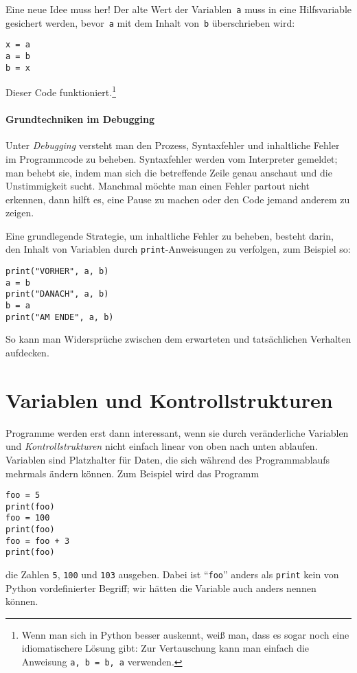 \documentclass{blatt}
\begin{document}
Eine neue Idee muss her! Der alte Wert der Variablen~\texttt{a} muss in eine
Hilfsvariable gesichert werden, bevor~\texttt{a} mit dem Inhalt von~\texttt{b}
überschrieben wird:
\begin{verbatim}
x = a
a = b
b = x
\end{verbatim}
Dieser Code funktioniert.\footnote{Wenn man sich in Python besser auskennt,
weiß man, dass es sogar noch eine idiomatischere Lösung gibt: Zur Vertauschung
kann man einfach die Anweisung \texttt{a, b = b, a} verwenden.}


\paragraph{Grundtechniken im Debugging} Unter \emph{Debugging} versteht man den
Prozess, Syntaxfehler und inhaltliche Fehler im Programmcode zu beheben.
Syntaxfehler werden vom Interpreter gemeldet; man behebt sie, indem man sich
die betreffende Zeile genau anschaut und die Unstimmigkeit sucht. Manchmal
möchte man einen Fehler partout nicht erkennen, dann hilft es, eine Pause zu
machen oder den Code jemand anderem zu zeigen.

Eine grundlegende Strategie, um inhaltliche Fehler zu beheben, besteht darin,
den Inhalt von Variablen durch \texttt{print}-Anweisungen zu
verfolgen, zum Beispiel so:
\begin{verbatim}
print("VORHER", a, b)
a = b
print("DANACH", a, b)
b = a
print("AM ENDE", a, b)
\end{verbatim}
So kann man Widersprüche zwischen dem erwarteten und tatsächlichen Verhalten
aufdecken.


\section{Variablen und Kontrollstrukturen}

Programme werden erst dann interessant, wenn sie durch veränderliche Variablen und
\emph{Kontrollstrukturen} nicht einfach linear von oben nach unten ablaufen.
Variablen sind Platzhalter für Daten, die sich während des Programmablaufs
mehrmals ändern können. Zum Beispiel wird das Programm
\begin{verbatim}
foo = 5
print(foo)
foo = 100
print(foo)
foo = foo + 3
print(foo)
\end{verbatim}
die Zahlen \texttt{5}, \texttt{100} und \texttt{103} ausgeben. Dabei ist "`\texttt{foo}"'
anders als \texttt{print} kein von Python vordefinierter
Begriff; wir hätten die Variable auch anders nennen können.
\end{document}
